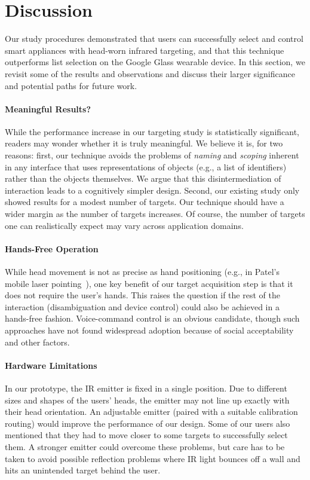\section{Discussion}
Our study procedures demonstrated that users can successfully select and control smart appliances with head-worn infrared targeting, and that this technique outperforms list selection on the Google Glass wearable device. In this section, we revisit some of the results and observations and discuss their larger significance and potential paths for future work.

\paragraph{Meaningful Results?}
While the performance increase in our targeting study is statistically significant, readers may wonder whether it is truly meaningful. We believe it is, for two reasons: first, our technique avoids the problems of {\em naming} and {\em scoping} inherent in any interface that uses representations of objects (e.g., a list of identifiers) rather than the objects themselves. We argue that this disintermediation of interaction leads to a cognitively simpler design. Second, our existing study only showed results for a modest number of targets. Our technique should have a wider margin as the number of targets increases. Of course, the number of targets one can realistically expect may vary across application domains.

\paragraph{Hands-Free Operation}
While head movement is not as precise as hand positioning (e.g., in Patel's mobile laser pointing~\cite{patel_2-way_2003}), one key benefit of our target acquisition step is that it does not require the user's hands. This raises the question if the rest of the interaction (disambiguation and device control) could also be achieved in a hands-free fashion. Voice-command control is an obvious candidate, though such approaches have not found widespread adoption because of social acceptability and other factors.

\paragraph{Hardware Limitations}
In our prototype, the IR emitter is fixed in a single position. Due to different sizes and shapes of the users’ heads, the emitter may not line up exactly with their head orientation. An adjustable emitter (paired with a suitable calibration routing) would improve the performance of our design. Some of our users also mentioned that they had to move closer to some targets to successfully select them. A stronger emitter could overcome these problems, but care has to be taken to avoid possible reflection problems where IR light bounces off a wall and hits an unintended target behind the user.

